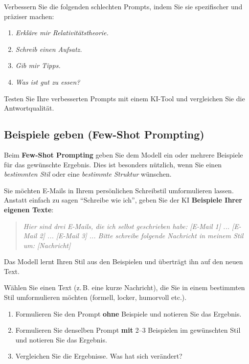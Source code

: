 \begin{myexercise}
Verbessern Sie die folgenden schlechten Prompts, indem Sie sie spezifischer
und präziser machen:

\begin{enumerate}
    \item \textit{Erkläre mir Relativitätstheorie.}
    \item \textit{Schreib einen Aufsatz.}
    \item \textit{Gib mir Tipps.}
    \item \textit{Was ist gut zu essen?}
\end{enumerate}

Testen Sie Ihre verbesserten Prompts mit einem KI-Tool und vergleichen Sie
die Antwortqualität.
\end{myexercise}

\subsection{Beispiele geben (Few-Shot Prompting)}

\begin{mydefinition}
Beim \textbf{Few-Shot Prompting} geben Sie dem Modell ein oder mehrere Beispiele
für das gewünschte Ergebnis. Dies ist besonders nützlich, wenn Sie einen
\emph{bestimmten Stil} oder eine \emph{bestimmte Struktur} wünschen.
\end{mydefinition}

\begin{myexample}
Sie möchten E-Mails in Ihrem persönlichen Schreibstil umformulieren lassen.
Anstatt einfach zu sagen \enquote{Schreibe wie ich}, geben Sie der KI
\textbf{Beispiele Ihrer eigenen Texte}:

\begin{quote}
\textit{Hier sind drei E-Mails, die ich selbst geschrieben habe: [E-Mail 1] ... [E-Mail 2] ...
[E-Mail 3] ... Bitte schreibe folgende Nachricht in meinem Stil um: [Nachricht]}
\end{quote}

Das Modell lernt Ihren Stil aus den Beispielen und überträgt ihn auf den neuen Text.
\end{myexample}

\begin{myexercise}
Wählen Sie einen Text (z.\,B. eine kurze Nachricht), die Sie in einem
bestimmten Stil umformulieren möchten (formell, locker, humorvoll etc.).

\begin{enumerate}
    \item Formulieren Sie den Prompt \textbf{ohne} Beispiele und notieren Sie
          das Ergebnis.
    \item Formulieren Sie denselben Prompt \textbf{mit} 2--3 Beispielen
          im gewünschten Stil und notieren Sie das Ergebnis.
    \item Vergleichen Sie die Ergebnisse. Was hat sich verändert?
\end{enumerate}
\end{myexercise}

